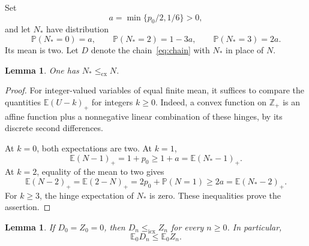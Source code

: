 \documentclass[11pt]{amsart}
\numberwithin{equation}{section}
\newtheorem{lemma}[theorem]{Lemma}
\theoremstyle{remark}
\newcommand{\E}{\mathbb E}
\newcommand{\Pp}{\mathbb P}
\newcommand{\Z}{\mathbb Z}
\newcommand{\cx}{\le_{\mathrm{cx}}}
\newcommand{\icx}{\le_{\mathrm{icx}}}
\begin{document}
Set
\begin{equation}\label{eq:a}
 a=\min\{p_0/2,1/6\}>0,
\end{equation}
and let $N_*$ have distribution
\begin{equation}\label{eq:Nstar}
 \Pp(N_*=0)=a,\qquad
 \Pp(N_*=2)=1-3a,\qquad
 \Pp(N_*=3)=2a.
\end{equation}
Its mean is two. Let $D$ denote the chain~\eqref{eq:chain} with $N_*$ in place of $N$.

\begin{lemma}\label{lem:convexorder}
One has $N_*\cx N$.
\end{lemma}

\begin{proof}
For integer-valued variables of equal finite mean, it suffices to compare the quantities $\E(U-k)_+$ for integers $k\ge0$. Indeed, a convex function on $\Z_+$ is an affine function plus a nonnegative linear combination of these hinges, by its discrete second differences.

At $k=0$, both expectations are two. At $k=1$,
\[
 \E(N-1)_+=1+p_0\ge1+a=\E(N_*-1)_+.
\]
At $k=2$, equality of the mean to two gives
\[
 \E(N-2)_+=\E(2-N)_+
 =2p_0+\Pp(N=1)\ge2a=\E(N_*-2)_+.
\]
For $k\ge3$, the hinge expectation of $N_*$ is zero. These inequalities prove the assertion.
\end{proof}

\begin{lemma}\label{lem:kernels}
If $D_0=Z_0=0$, then $D_n\icx Z_n$ for every $n\ge0$. In particular,
\begin{equation}\label{eq:meancompare}
 \E_0D_n\le\E_0Z_n.
\end{equation}
\end{lemma}
\end{document}
